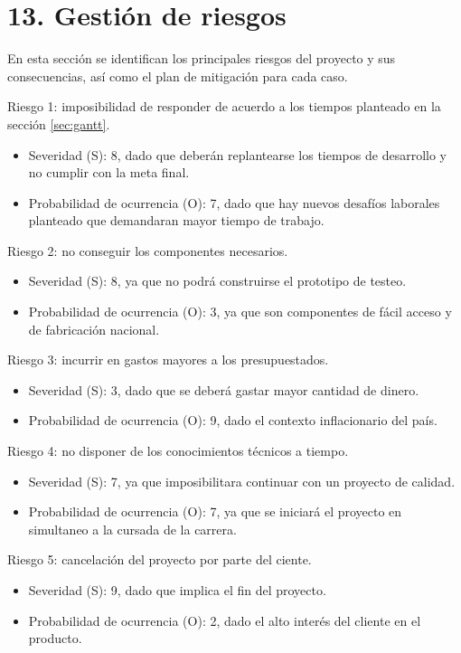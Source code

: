\documentclass[
11pt, %
]{charter}
\begin{document}
\section{13. Gestión de riesgos}
\label{sec:riesgos}

En esta sección se identifican los principales riesgos del proyecto y sus consecuencias, así como el plan de mitigación para cada caso.

Riesgo 1: imposibilidad de responder de acuerdo a los tiempos planteado en la sección \ref{sec:gantt}.
\begin{itemize}
	\item Severidad (S): 8, dado que deberán replantearse los tiempos de desarrollo y no cumplir con la meta final.
	\item Probabilidad de ocurrencia (O): 7, dado que hay nuevos desafíos laborales planteado que demandaran mayor tiempo de trabajo. 
\end{itemize}

Riesgo 2: no conseguir los componentes necesarios.
\begin{itemize}
	\item Severidad (S): 8, ya que no podrá construirse el prototipo de testeo.
	\item Probabilidad de ocurrencia (O): 3, ya que son componentes de fácil acceso y de fabricación nacional. 
\end{itemize}

Riesgo 3: incurrir en gastos mayores a los presupuestados.
\begin{itemize}
	\item Severidad (S): 3, dado que se deberá gastar mayor cantidad de dinero.
	\item Probabilidad de ocurrencia (O): 9, dado el contexto inflacionario del país. 
\end{itemize}

Riesgo 4: no disponer de los conocimientos técnicos a tiempo.
\begin{itemize}
	\item Severidad (S): 7, ya que imposibilitara continuar con un proyecto de calidad.
	\item Probabilidad de ocurrencia (O): 7, ya que se iniciará el proyecto en simultaneo a la cursada de la carrera. 
\end{itemize}

Riesgo 5: cancelación del proyecto por parte del ciente.
\begin{itemize}
	\item Severidad (S): 9, dado que implica el fin del proyecto.
	\item Probabilidad de ocurrencia (O): 2, dado el alto interés del cliente en el producto. 
\end{itemize}
\end{document}
